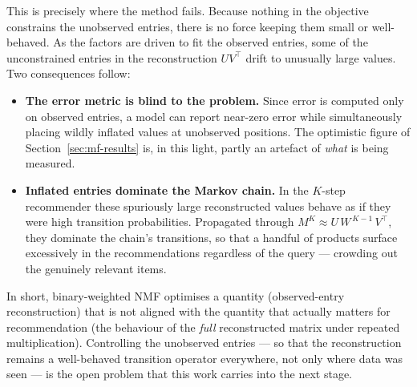 This is precisely where the method fails. Because nothing in the objective
constrains the unobserved entries, there is no force keeping them small or
well-behaved. As the factors are driven to fit the observed entries, some of
the unconstrained entries in the reconstruction $U V^{\top}$ drift to
unusually large values. Two consequences follow:

\begin{itemize}
  \item \textbf{The error metric is blind to the problem.} Since error is
        computed only on observed entries, a model can report near-zero error
        while simultaneously placing wildly inflated values at unobserved
        positions. The optimistic figure of Section~\ref{sec:mf-results} is, in
        this light, partly an artefact of \emph{what} is being measured.
  \item \textbf{Inflated entries dominate the Markov chain.} In the $K$-step
        recommender these spuriously large reconstructed values behave as if
        they were high transition probabilities. Propagated through
        $M^{K}\approx U\,W^{\,K-1}\,V^{\top}$, they dominate the chain's
        transitions, so that a handful of products surface excessively in the
        recommendations regardless of the query --- crowding out the genuinely
        relevant items.
\end{itemize}

In short, binary-weighted NMF optimises a quantity (observed-entry
reconstruction) that is not aligned with the quantity that actually matters for
recommendation (the behaviour of the \emph{full} reconstructed matrix under
repeated multiplication). Controlling the unobserved entries --- so that the
reconstruction remains a well-behaved transition operator everywhere, not only
where data was seen --- is the open problem that this work carries into the
next stage.
